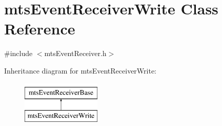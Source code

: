 \hypertarget{classmts_event_receiver_write}{\section{mts\-Event\-Receiver\-Write Class Reference}
\label{classmts_event_receiver_write}
}


{\ttfamily \#include $<$mts\-Event\-Receiver.\-h$>$}

Inheritance diagram for mts\-Event\-Receiver\-Write\-:\begin{figure}[H]
\begin{center}
\leavevmode
\includegraphics[height=2.000000cm]{dd/ddf/classmts_event_receiver_write}
\end{center}
\end{figure}
